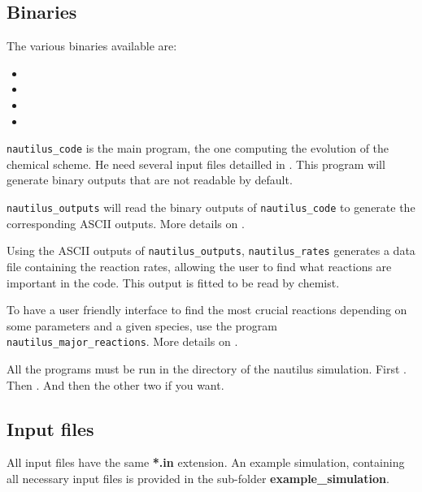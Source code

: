 \documentclass[english,a4paper,twoside]{article}
\begin{document}
\subsection{Binaries}
The various binaries available are:
\begin{itemize}
\item {}
\item {}
\item {}
\item {}
\end{itemize}

\verb|nautilus_code| is the main program, the one computing the evolution of the chemical scheme. He need several input files 
detailled in . This program will generate binary outputs that are not readable by default.

\verb|nautilus_outputs| will read the binary outputs of \verb|nautilus_code| to generate the corresponding ASCII outputs. More 
details on .

Using the ASCII outputs of \verb|nautilus_outputs|, \verb|nautilus_rates| generates a data file containing the reaction rates, 
allowing the user to find what reactions are important in the code. This output is fitted to be read by chemist.

To have a user friendly interface to find the most crucial reactions depending on some parameters and a given species, use the 
program \verb|nautilus_major_reactions|. More details on .

\begin{remarque}
All the programs must be run in the directory of the nautilus simulation. First . 
Then . And then the other two if you want.
\end{remarque}



\subsection{Input files}\label{sec:input-files}
All input files have the same \textbf{*.in} extension. An example simulation, containing all necessary input files is provided in the sub-folder \textbf{example\_simulation}.
\end{document}
